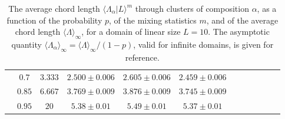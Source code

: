 \documentclass[final,authoryear,5p,times,twocolumn]{elsarticle}
\begin{document}
\begin{table*}
\begin{center}
\begin{tabular}{cccccccccccc}
& $0.7$ & $3.333$ & $2.500 \pm 0.006$ & $2.605 \pm 0.006$ & $2.459 \pm 0.006$ \\
& $0.85$ & $6.667$ & $3.769 \pm 0.009$ & $3.876 \pm 0.009$ & $3.745 \pm 0.009$ \\
& $0.95$ & $20$ & $5.38 \pm 0.01$ & $5.49 \pm 0.01$ & $5.37 \pm 0.01$ \\
\bottomrule
\end{tabular}
\end{center}
\caption{The average chord length $\langle \Lambda_\alpha | L\rangle ^m$ through clusters of composition $\alpha$, as a function of the probability $p$, of the mixing statistics $m$, and of the average chord length ${\langle \Lambda \rangle}_{\infty}$, for a domain of linear size $L=10$. The asymptotic quantity ${\langle \Lambda_{\alpha} \rangle}_{\infty}={\langle \Lambda \rangle}_{\infty}/(1-p)$, valid for infinite domains, is given for reference.}
\label{tab_lambda_alpha}
\end{table*}

\clearpage
\end{document}
